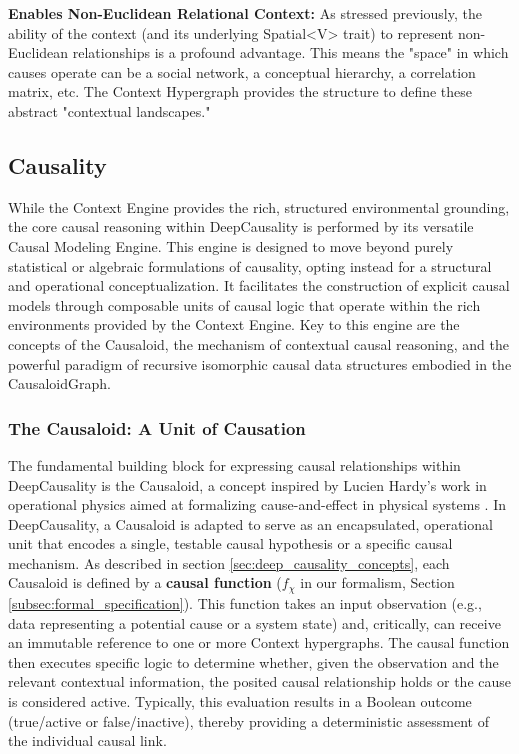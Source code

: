 \textbf{Enables Non-Euclidean Relational Context: }As stressed previously, the ability of the context (and its underlying Spatial<V> trait) to represent non-Euclidean relationships is a profound advantage. This means the "space" in which causes operate can be a social network, a conceptual hierarchy, a correlation matrix, etc. The Context Hypergraph provides the structure to define these abstract "contextual landscapes."

\newpage

\subsection{Causality}
\label{sec:deep_causality_causality}

While the Context Engine provides the rich, structured environmental grounding, the core causal reasoning within DeepCausality is performed by its versatile Causal Modeling Engine. This engine is designed to move beyond purely statistical or algebraic formulations of causality, opting instead for a structural and operational conceptualization. It facilitates the construction of explicit causal models through composable units of causal logic that operate within the rich environments provided by the Context Engine. Key to this engine are the concepts of the Causaloid, the mechanism of contextual causal reasoning, and the powerful paradigm of recursive isomorphic causal data structures embodied in the CausaloidGraph.

\subsubsection{The Causaloid: A Unit of Causation}
\label{subsubsec:causaloid}

The fundamental building block for expressing causal relationships within DeepCausality is the Causaloid, a concept inspired by Lucien Hardy's work in operational physics aimed at formalizing cause-and-effect in physical systems \cite{hardy2005probability, DeepCausalityWebsite}. In DeepCausality, a Causaloid is adapted to serve as an encapsulated, operational unit that encodes a single, testable causal hypothesis or a specific causal mechanism. As described in section \ref{sec:deep_causality_concepts}, each Causaloid is defined by a \textbf{causal function} ($f_\chi$ in our formalism, Section \ref{subsec:formal_specification}). This function takes an input observation (e.g., data representing a potential cause or a system state) and, critically, can receive an immutable reference to one or more Context hypergraphs. The causal function then executes specific logic to determine whether, given the observation and the relevant contextual information, the posited causal relationship holds or the cause is considered active. Typically, this evaluation results in a Boolean outcome (true/active or false/inactive), thereby providing a deterministic assessment of the individual causal link.

